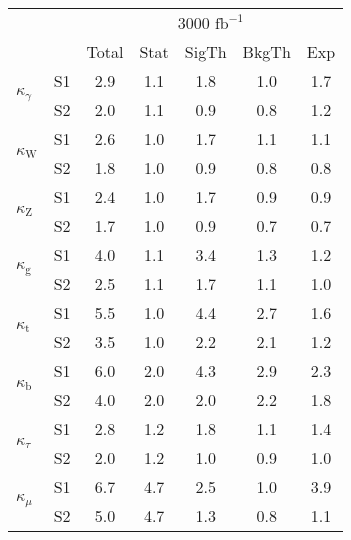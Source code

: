\begin{tabular}{@{} l c c@{\hskip 0.15in} c c c c @{}}
 \hline
  &  & \multicolumn{5}{c}{3000 $\text{fb}^{-1}$} \\
  &  & Total & Stat & SigTh & BkgTh & Exp \\
 \hline
\multirow{2}{*}{$\kappa_{\gamma }$} & S1  & 2.9& 1.1 & 1.8 & 1.0 & 1.7  \\[1pt]
                        & S2  & 2.0& 1.1 & 0.9 & 0.8 & 1.2  \\[4pt]
\multirow{2}{*}{$\kappa_{\mathrm{W}}$} & S1  & 2.6& 1.0 & 1.7 & 1.1 & 1.1  \\[1pt]
                        & S2  & 1.8& 1.0 & 0.9 & 0.8 & 0.8  \\[4pt]
\multirow{2}{*}{$\kappa_{\mathrm{Z}}$} & S1  & 2.4& 1.0 & 1.7 & 0.9 & 0.9  \\[1pt]
                        & S2  & 1.7& 1.0 & 0.9 & 0.7 & 0.7  \\[4pt]
\multirow{2}{*}{$\kappa_{\mathrm{g}}$} & S1  & 4.0& 1.1 & 3.4 & 1.3 & 1.2  \\[1pt]
                        & S2  & 2.5& 1.1 & 1.7 & 1.1 & 1.0  \\[4pt]
\multirow{2}{*}{$\kappa_{\mathrm{t}}$} & S1  & 5.5& 1.0 & 4.4 & 2.7 & 1.6  \\[1pt]
                        & S2  & 3.5& 1.0 & 2.2 & 2.1 & 1.2  \\[4pt]
\multirow{2}{*}{$\kappa_{\mathrm{b}}$} & S1  & 6.0& 2.0 & 4.3 & 2.9 & 2.3  \\[1pt]
                        & S2  & 4.0& 2.0 & 2.0 & 2.2 & 1.8  \\[4pt]
\multirow{2}{*}{$\kappa_{\tau }$} & S1  & 2.8& 1.2 & 1.8 & 1.1 & 1.4  \\[1pt]
                        & S2  & 2.0& 1.2 & 1.0 & 0.9 & 1.0  \\[4pt]
\multirow{2}{*}{$\kappa_{\mu}$} & S1  & 6.7& 4.7 & 2.5 & 1.0 & 3.9  \\[1pt]
                        & S2  & 5.0& 4.7 & 1.3 & 0.8 & 1.1  \\[4pt]
\hline
\end{tabular}